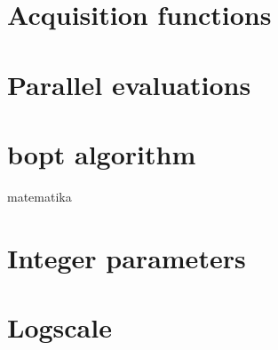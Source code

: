 \section{Acquisition functions}
\label{section:acq-fn}



\section{Parallel evaluations}

\section{bopt algorithm}

matematika

\section{Integer parameters}

\section{Logscale}

